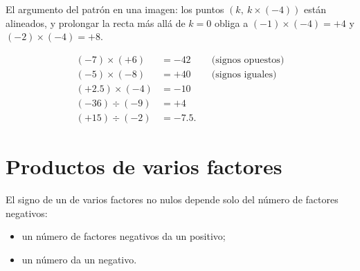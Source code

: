 \begin{omfigure}

{\small El argumento del patrón en una imagen: los puntos
$(k,\ k \times (-4))$ están alineados, y prolongar la recta más allá de $k = 0$
obliga a $(-1)\times(-4) = +4$ y $(-2)\times(-4) = +8$.}
\end{omfigure}

\begin{example}\label{ex:g8:negprod:products}
\begin{align*}
(-7) \times (+6) &= -42 && \text{(signos opuestos)} \\
(-5) \times (-8) &= +40 && \text{(signos iguales)} \\
(+2.5) \times (-4) &= -10 \\
(-36) \div (-9) &= +4 \\
(+15) \div (-2) &= -7.5 .
\end{align*}
\end{example}

\section{Productos de varios factores}

\begin{proposition}\label{prop:g8:negprod:many}
El signo de un  de varios factores no nulos depende solo del
número de factores negativos:
\begin{itemize}
  \item un número \emph{} de factores negativos da un 
        positivo;
  \item un número \emph{} da un  negativo.
\end{itemize}
\end{proposition}

